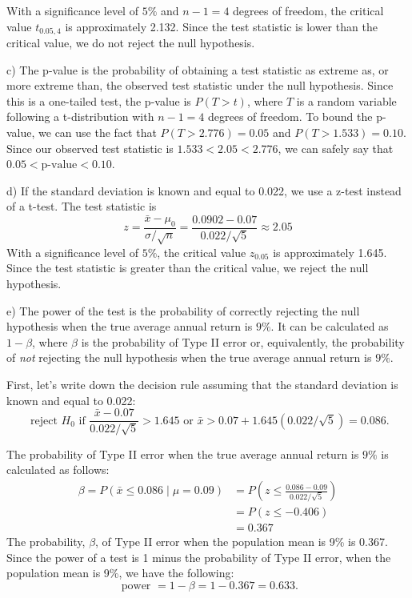 \documentclass[12pt]{article}
\begin{document}
\begin{enumerate}
{	With a significance level of $5\%$ and $n-1 = 4$ degrees of freedom, the critical value $t_{0.05,4}$ is approximately 2.132. Since the test statistic is lower than the critical value, we do not reject the null hypothesis.\medskip
	
	c) The p-value is the probability of obtaining a test statistic as extreme as, or more extreme than, the observed test statistic under the null hypothesis. Since this is a one-tailed test, the p-value is $P(T > t)$, where $T$ is a random variable following a t-distribution with $n-1 = 4$ degrees of freedom. To bound the p-value, we can use the fact that $P(T > 2.776) = 0.05$ and $P(T > 1.533) = 0.10$. Since our observed test statistic is $1.533<2.05<2.776$, we can safely say that $0.05<\text{p-value}<0.10$.
	
	d) If the standard deviation is known and equal to 0.022, we use a z-test instead of a t-test. The test statistic is 
	$$z = \frac{\bar{x} - \mu_0}{\sigma/\sqrt{n}} = \frac{0.0902 - 0.07}{0.022/\sqrt{5}} \approx 2.05$$
	With a significance level of $5\%$, the critical value $z_{0.05}$ is approximately 1.645. Since the test statistic is greater than the critical value, we reject the null hypothesis.\medskip
	
	e) The power of the test is the probability of correctly rejecting the null hypothesis when the true average annual return is $9\%$. It can be calculated as $1 - \beta$, where $\beta$ is the probability of Type II error or, equivalently, the probability of \textit{not} rejecting the null hypothesis when the true average annual return is $9\%$.\medskip
	
	First, let's write down the decision rule assuming that the standard deviation is known and equal to 0.022:
	$$
	\text { reject } H_0 \text { if } \frac{\bar{x} - 0.07}{0.022/\sqrt{5}} >1.645 \text { or } \bar{x}> 0.07+1.645(0.022 / \sqrt{5})=0.086.
	$$
	
	The probability of Type II error when the true average annual return is $9\%$ is calculated as follows:
	$$
	\begin{aligned}
		\beta=P(\bar{x} \leq 0.086 \mid \mu=0.09) & =P\left(z \leq \frac{0.086-0.09}{0.022 / \sqrt{5}}\right) \\
		& =P(z \leq-0.406) \\
		& =0.367
	\end{aligned}
	$$	
	The probability, $\beta$, of Type II error when the population mean is 9\% is 0.367. Since the power of a test is 1 minus the probability of Type II error, when the population mean is 9\%, we have the following:
	$$
	\text { power }=1-\beta=1-0.367=0.633.
	$$
}
\end{enumerate}
\end{document}
